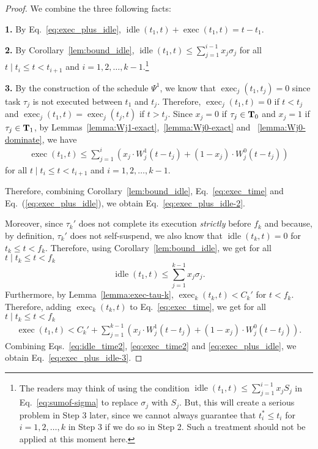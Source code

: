 \begin{proof}
We combine the three following facts:

\noindent\textbf{1.} By Eq.~\eqref{eq:exec_plus_idle}, $\operatorname{idle}(t_1, t)+\operatorname{exec}(t_1, t) = t-t_1$.

\noindent\textbf{2.} By Corollary~\ref{lem:bound_idle}, $\operatorname{idle}(t_1, t) \leq \sum_{j=1}^{i-1}
x_j \sigma_j $ for all $t \mid t_{i} \leq t < t_{i+1}$ and $i=1,2,\ldots,k-1$.\footnote{\label{footnote-why-sigma}The readers
  may think of using the condition $\operatorname{idle}(t_1, t) \leq
  \sum_{j=1}^{i-1} x_j S_j$ in Eq.~\eqref{eq:sumof-sigma} to
  replace $\sigma_j$ with $S_j$. But, this will create a serious
  problem in Step 3 later, since we cannot always guarantee that
  $t_i^*\leq t_i$ for $i=1,2,\ldots,k$ in Step 3 if we do so in Step 2. Such a treatment should not be applied at this moment here.}

\noindent\textbf{3.} By the construction of the
schedule $\Psi^1$, we know that $\operatorname{exec}_j(t_1, t_j)=0$ since task $\tau_j$ is not executed between $t_1$ and $t_j$. Therefore, $\operatorname{exec}_j(t_1, t)=0$ if $t<t_j$ and $\operatorname{exec}_j(t_1, t)=\operatorname{exec}_j(t_j, t)$ if $t > t_j$. Since $x_j = 0$ if $\tau_j \in {\bf T}_0$ and $x_j = 1$ if $\tau_j \in {\bf T}_1$, by Lemmas~\ref{lemma:Wj1-exact},~\ref{lemma:Wj0-exact} and ~\ref{lemma:Wj0-dominate}, we have
{\footnotesize \begin{align}
\label{eq:exec_time}
\operatorname{exec}(t_1, t) \leq \sum_{j=1}^{i} \left( x_j\cdot W_j^1(t-t_j)  + (1-x_j)\cdot W_j^0(t-t_j) \right)
\end{align}} 
for all $t \mid t_{i} \leq t < t_{i+1}$ and $i=1,2,\ldots,k-1$.

Therefore, combining Corollary~\ref{lem:bound_idle}, Eq.~\eqref{eq:exec_time} and Eq.~(\ref{eq:exec_plus_idle}), we obtain Eq.~\eqref{eq:exec_plus_idle-2}. 

Moreover, since $\tau_k'$ does not complete its execution
\emph{strictly} before $f_k$ and because, by definition, $\tau_k'$
does not self-suspend, we also know that $\operatorname{idle}(t_k, t) = 0$ for $t_k \leq t < f_k$. Therefore, using Corollary~\ref{lem:bound_idle}, we get for all $t \mid t_k \leq t < f_k$ 
\begin{equation}
\label{eq:idle_time2}
\operatorname{idle}(t_1, t) \leq \sum_{j=1}^{k-1}
x_j \sigma_j.
\end{equation}
Furthermore, by Lemma~\ref{lemma:exec-tau-k}, $\operatorname{exec}_k(t_k, t) < C_k'$ for $t < f_k$. Therefore, adding $\operatorname{exec}_k(t_k, t)$ to Eq.~\eqref{eq:exec_time}, we get for all $t \mid t_{k} \leq t < f_k$ 
{\footnotesize \begin{align}
\label{eq:exec_time2}
\operatorname{exec}(t_1, t) < C_k' + \sum_{j=1}^{k-1} \left( x_j\cdot W_j^1(t-t_j)  + (1-x_j)\cdot W_j^0(t-t_j) \right).
\end{align}}
Combining Eqs.~\eqref{eq:idle_time2}, \eqref{eq:exec_time2} and \eqref{eq:exec_plus_idle}, we obtain Eq.~\eqref{eq:exec_plus_idle-3}.
\end{proof}




